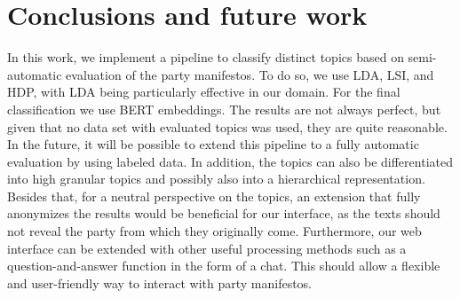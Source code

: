 \section{Conclusions and future work}
In this work, we implement a pipeline to classify distinct topics based on semi-automatic evaluation of the party manifestos. To do so, we use LDA, LSI, and HDP, with LDA being particularly effective in our domain. For the final classification we use BERT embeddings. The results are not always perfect, but given that no data set with evaluated topics was used, they are quite reasonable.
In the future, it will be possible to extend this pipeline to a fully automatic evaluation by using labeled data. In addition, the topics can also be differentiated into high granular topics and possibly also into a hierarchical representation. 
Besides that, for a neutral perspective on the topics, an extension that fully anonymizes the results would be beneficial for our interface, as the texts should not reveal the party from which they originally come.
Furthermore, our web interface can be extended with other useful processing methods such as a question-and-answer function in the form of a chat.  
This should allow a flexible and user-friendly way to interact with party manifestos.